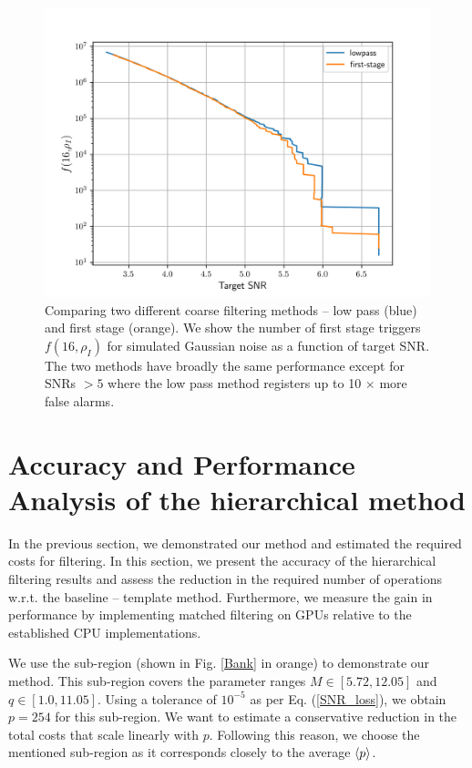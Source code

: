 \begin{figure}
    \centering
    \includegraphics[width=\linewidth]{figures/Hierarchical_MF/Lowpass.pdf}
    \caption{Comparing two different coarse filtering methods -- low pass (blue) and first stage (orange). We show the number of first stage triggers $f(16, \rho_{I})$ for simulated Gaussian noise as a function of target SNR. The two methods have broadly the same performance except for SNRs $> 5$ where the low pass method registers up to 10 $\times$ more false alarms. }
    \label{lowpass_vs_first}
\end{figure}


\section{Accuracy and Performance Analysis of the hierarchical method}\label{Sec:Results}

In the previous section, we demonstrated our method and estimated the required costs for filtering. In this section, we present the accuracy of the hierarchical filtering results and assess the reduction in the required number of operations w.r.t. the baseline -- template method. Furthermore, we measure the gain in performance by implementing matched filtering on GPUs relative to the established CPU implementations.

We use the sub-region (shown in Fig. \ref{Bank} in orange) to demonstrate our method. This sub-region covers the parameter ranges $M \in [5.72, 12.05]$ and $q \in [1.0, 11.05]$. Using a tolerance of $10^{-5}$ as per Eq. (\ref{SNR_loss}), we obtain $p = 254$ for this sub-region. We want to estimate a conservative reduction in the total costs that scale linearly with $p$. Following this reason, we choose the mentioned sub-region as it corresponds closely to the average $\Braket{p}$.


